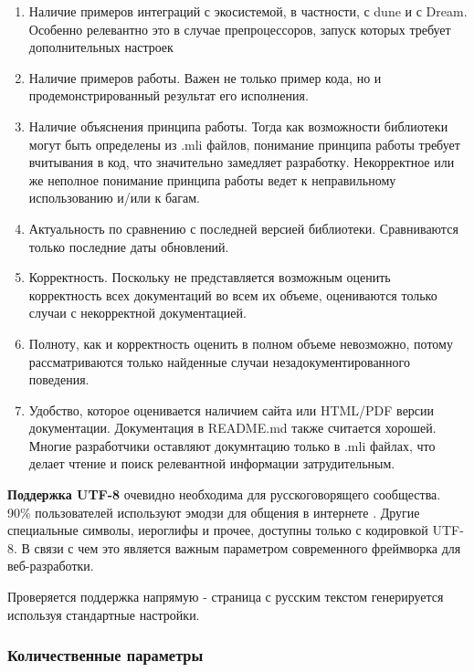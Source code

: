 \begin{enumerate}
    \item Наличие примеров интеграций с экосистемой, в частности, с dune и с Dream. Особенно релевантно это в случае препроцессоров, запуск которых требует дополнительных настроек
    \item Наличие примеров работы. Важен не только пример кода, но и продемонстрированный результат его исполнения.
    \item Наличие объяснения принципа работы. Тогда как возможности библиотеки могут быть определены из .mli файлов, понимание принципа работы требует вчитывания в код, что значительно замедляет разработку. Некорректное или же неполное понимание принципа работы ведет к неправильному использованию и/или к багам.
    \item Актуальность по сравнению с последней версией библиотеки. Сравниваются только последние даты обновлений.
    \item Корректность. Поскольку не представляется возможным оценить корректность всех документаций во всем их объеме, оцениваются только случаи с некорректной документацией.
    \item Полноту, как и корректность оценить в полном объеме невозможно, потому рассматриваются только найденные случаи незадокументированного поведения.
    \item Удобство, которое оценивается наличием сайта или HTML/PDF версии документации. Документация в README.md также считается хорошей. Многие разработчики оставляют докумнтацию только в .mli файлах, что делает чтение и поиск релевантной информации затрудительным.
\end{enumerate}

\textbf{Поддержка UTF-8} очевидно необходима для русскоговорящего сообщества.
90\% пользователей используют эмодзи для общения в интернете \cite{george2023emoji}.
Другие специальные символы, иероглифы и прочее, доступны только с кодировкой UTF-8.
В связи с чем это является важным параметром современного фреймворка для веб-разработки.

Проверяется поддержка напрямую - страница с русским текстом генерируется используя стандартные настройки.

\subsubsection{Количественные параметры}

